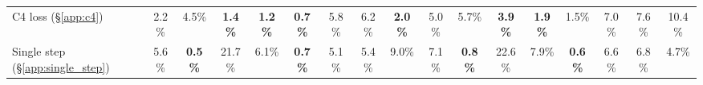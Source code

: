 \begin{table}[t]
{\begin{tabular}{l | c c c c c c c c | c c c c c c c c}
C4 loss (\S\ref{app:c4}) & 2.2\% & 4.5\% & \textbf{1.4\%} & \textbf{1.2\%} & \textbf{0.7\%} & 5.8\% & 6.2\% & \textbf{2.0\%} & 5.0\% & 5.7\% & \textbf{3.9\%} & \textbf{1.9\%} & 1.5\% & 7.0\% & 7.6\% & 10.4\% \\
Single step (\S\ref{app:single_step}) & 5.6\% & \textbf{0.5\%} & 21.7\% & 6.1\% & \textbf{0.7\%} & 5.1\% & 5.4\% & 9.0\% & 7.1\% & \textbf{0.8\%} & 22.6\% & 7.9\% & \textbf{0.6\%} & 6.6\% & 6.8\% & 4.7\% \\
\bottomrule
\end{tabular}
}%
\label{tab:design_choices}
\vspace{-8pt}
\end{table}


